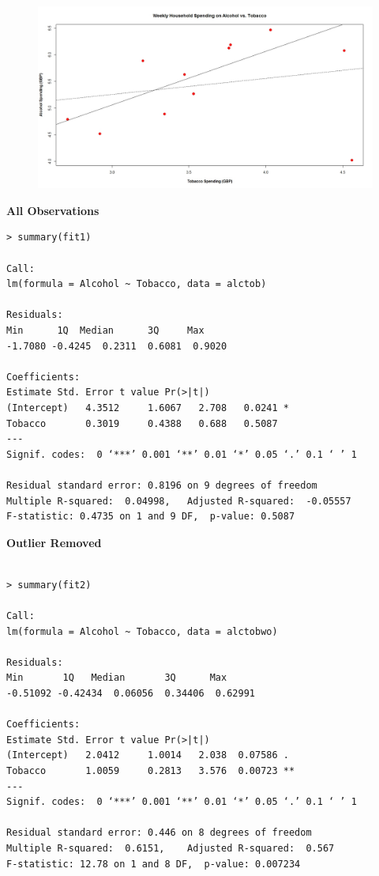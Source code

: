 \documentclass[residuals.tex]{subfiles}
\begin{document}
\begin{figure}
	\centering
	\includegraphics[width=1.3\linewidth]{alcotob2}
	\caption{}
	\label{fig:alcotob}
\end{figure}
\newpage	
\begin{framed}	
\textbf{All Observations}	
\begin{verbatim}
> summary(fit1)

Call:
lm(formula = Alcohol ~ Tobacco, data = alctob)

Residuals:
Min      1Q  Median      3Q     Max 
-1.7080 -0.4245  0.2311  0.6081  0.9020 

Coefficients:
Estimate Std. Error t value Pr(>|t|)  
(Intercept)   4.3512     1.6067   2.708   0.0241 *
Tobacco       0.3019     0.4388   0.688   0.5087  
---
Signif. codes:  0 ‘***’ 0.001 ‘**’ 0.01 ‘*’ 0.05 ‘.’ 0.1 ‘ ’ 1

Residual standard error: 0.8196 on 9 degrees of freedom
Multiple R-squared:  0.04998,   Adjusted R-squared:  -0.05557 
F-statistic: 0.4735 on 1 and 9 DF,  p-value: 0.5087
\end{verbatim}
\end{framed}

\begin{framed}
\textbf{Outlier Removed	}
\begin{verbatim}

> summary(fit2)

Call:
lm(formula = Alcohol ~ Tobacco, data = alctobwo)

Residuals:
Min       1Q   Median       3Q      Max 
-0.51092 -0.42434  0.06056  0.34406  0.62991 

Coefficients:
Estimate Std. Error t value Pr(>|t|)   
(Intercept)   2.0412     1.0014   2.038  0.07586 . 
Tobacco       1.0059     0.2813   3.576  0.00723 **
---
Signif. codes:  0 ‘***’ 0.001 ‘**’ 0.01 ‘*’ 0.05 ‘.’ 0.1 ‘ ’ 1

Residual standard error: 0.446 on 8 degrees of freedom
Multiple R-squared:  0.6151,    Adjusted R-squared:  0.567 
F-statistic: 12.78 on 1 and 8 DF,  p-value: 0.007234

\end{verbatim}
\end{framed}
\end{document}

